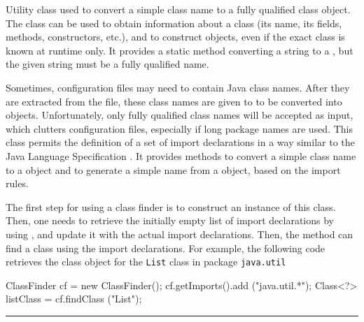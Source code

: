 
Utility class used to convert a simple class name to
a fully qualified class object.
The  class can be used to obtain
information about a class (its name, its fields, methods,
constructors, etc.), and to construct objects, even
if the exact class is known at runtime only.
It provides a  static method converting
a string to a , but the given string
must be a fully qualified name.

Sometimes, configuration files may need
to contain Java class names. After they are
extracted from the file, these class names are
given to  to be converted into
 objects.
Unfortunately, only
fully qualified class names will be accepted
as input, which clutters
configuration files, especially if long package names are used.
This class permits the definition of a set of
import declarations in a way similar to the
Java Language Specification \cite{iGOS00a}.
It provides methods to convert a simple class name
to a  object and to generate a simple name
from a  object, based on the import
rules.

The first step for using a class finder is to construct an instance of
this class.
Then, one needs to retrieve the initially empty list of import
declarations by
using , and update it with the
actual import declarations.
Then, the method  can find a class using the
import declarations.
For example, the following code retrieves the class object for the
\texttt{List} class in package \texttt{java.util}
\begin{vcode}
   ClassFinder cf = new ClassFinder();
   cf.getImports().add ("java.util.*");
   Class<?> listClass = cf.findClass ("List");
\end{vcode}

\bigskip\hrule\bigskip

